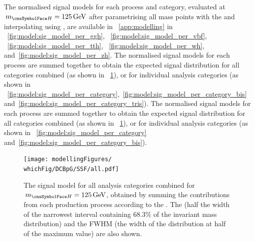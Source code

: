 \ifNewAnalysis
The normalised signal models for each process and category, evaluated at $\mH=125\GeV$ after parametrising all mass points with the \DCBpG and interpolating using \SSF, are available in \App~\ref{app:modelling} in \Fig\s~\ref{fig:model:sig_model_per_ggh}, ~\ref{fig:model:sig_model_per_vbf}, ~\ref{fig:model:sig_model_per_tth}, ~\ref{fig:model:sig_model_per_wh}, and~\ref{fig:model:sig_model_per_zh}.
The normalised signal models for each process are summed together to obtain the expected signal \mgg distribution for all categories combined (as shown in \Fig\s~\ref{fig:model:sig_model_all}), or for individual analysis categories (as shown in \Fig\s~\ref{fig:model:sig_model_per_category},~\ref{fig:model:sig_model_per_category_bis} and~\ref{fig:model:sig_model_per_category_tris}).
\else
The normalised signal models for each process are summed together to obtain the expected signal \mgg distribution for all categories combined (as shown in \Fig\s~\ref{fig:model:sig_model_all}), or for individual analysis categories (as shown in \Fig\s~\ref{fig:model:sig_model_per_category} and~\ref{fig:model:sig_model_per_category_bis}).
\fi
\begin{figure}[ht!]
\centering
\texttt{[image: modellingFigures/\\whichFig/DCBpG/SSF/all.pdf]} 

\caption{The signal model for all analysis categories combined for $\mH=125\GeV$, obtained by summing the contributions from each production process according to the \effxacc. The \effSigma (half the width of the narrowest interval containing 68.3\% of the invariant mass distribution) and the FWHM (the width of the distribution at half of the maximum value) are also shown. }

\label{fig:model:sig_model_all}
\end{figure}

